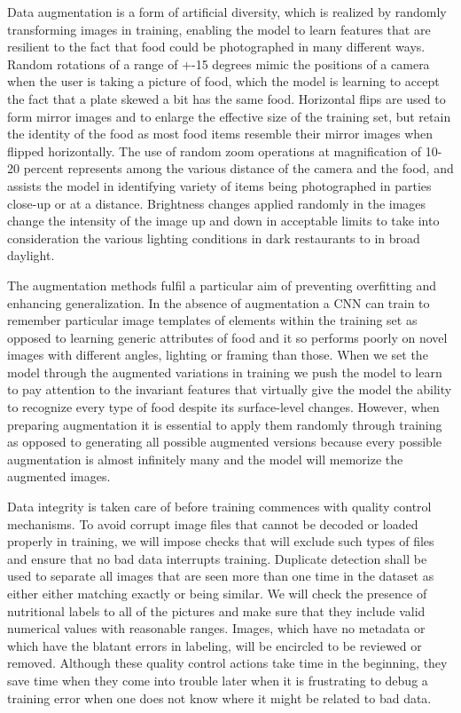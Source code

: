 \documentclass[12pt, openany]{report}
\begin{document}
Data augmentation is a form of artificial diversity, which is realized by randomly transforming images in training, enabling the model to learn features that are resilient to the fact that food could be photographed in many different ways. Random rotations of a range of +-15 degrees mimic the positions of a camera when the user is taking a picture of food, which the model is learning to accept the fact that a plate skewed a bit has the same food. Horizontal flips are used to form mirror images and to enlarge the effective size of the training set, but retain the identity of the food as most food items resemble their mirror images when flipped horizontally. The use of random zoom operations at magnification of 10-20 percent represents among the various distance of the camera and the food, and assists the model in identifying variety of items being photographed in parties close-up or at a distance. Brightness changes applied randomly in the images change the intensity of the image up and down in acceptable limits to take into consideration the various lighting conditions in dark restaurants to in broad daylight.

The augmentation methods fulfil a particular aim of preventing overfitting and enhancing generalization. In the absence of augmentation a CNN can train to remember particular image templates of elements within the training set as opposed to learning generic attributes of food and it so performs poorly on novel images with different angles, lighting or framing than those. When we set the model through the augmented variations in training we push the model to learn to pay attention to the invariant features that virtually give the model the ability to recognize every type of food despite its surface-level changes. However, when preparing augmentation it is essential to apply them randomly through training as opposed to generating all possible augmented versions because every possible augmentation is almost infinitely many and the model will memorize the augmented images.

Data integrity is taken care of before training commences with quality control mechanisms. To avoid corrupt image files that cannot be decoded or loaded properly in training, we will impose checks that will exclude such types of files and ensure that no bad data interrupts training. Duplicate detection shall be used to separate all images that are seen more than one time in the dataset as either either matching exactly or being similar. We will check the presence of nutritional labels to all of the pictures and make sure that they include valid numerical values with reasonable ranges. Images, which have no metadata or which have the blatant errors in labeling, will be encircled to be reviewed or removed. Although these quality control actions take time in the beginning, they save time when they come into trouble later when it is frustrating to debug a training error when one does not know where it might be related to bad data.
\end{document}
